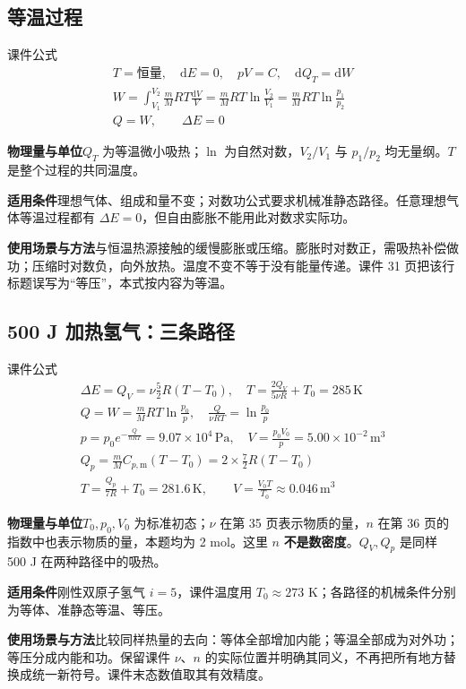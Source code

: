 \documentclass[UTF8,fontset=none,zihao=-4,a4paper]{ctexart}
\newcommand{\unit}[1]{\,\mathrm{#1}}
\newcommand{\explain}[3]{\par\noindent\textbf{物理量与单位}\quad #1\par
\noindent\textbf{适用条件}\quad #2\par
\noindent\textbf{使用场景与方法}\quad #3\par}
\begin{document}
\par\noindent\begin{minipage}{\linewidth}
\subsection{等温过程}
\begin{infobox}[breakable=false]{课件公式}
\begin{gather*}T=\text{恒量},\quad\mathrm dE=0,\quad pV=C,\quad\mathrm dQ_T=\mathrm dW\\W=\int_{V_1}^{V_2}\frac mM RT\frac{\mathrm dV}V=\frac mM RT\ln\frac{V_2}{V_1}=\frac mM RT\ln\frac{p_1}{p_2}\\Q=W,\qquad\Delta E=0\end{gather*}
\end{infobox}
\end{minipage}\par
\explain{$Q_T$ 为等温微小吸热；$\ln$ 为自然对数，$V_2/V_1$ 与 $p_1/p_2$ 均无量纲。$T$ 是整个过程的共同温度。}{理想气体、组成和量不变；对数功公式要求机械准静态路径。任意理想气体等温过程都有 $\Delta E=0$，但自由膨胀不能用此对数求实际功。}{与恒温热源接触的缓慢膨胀或压缩。膨胀时对数正，需吸热补偿做功；压缩时对数负，向外放热。温度不变不等于没有能量传递。课件 31 页把该行标题误写为“等压”，本式按内容为等温。}


\par\noindent\begin{minipage}{\linewidth}
\subsection{500 J 加热氢气：三条路径}
\begin{infobox}[breakable=false]{课件公式}
\begin{gather*}\Delta E=Q_V=\nu\frac52R(T-T_0),\quad T=\frac{2Q_V}{5\nu R}+T_0=285\unit K\\Q=W=\frac mM RT\ln\frac{p_0}p,\quad\frac Q{\nu RT}=\ln\frac{p_0}p\\p=p_0e^{-\frac Q{nRT}}=9.07\times10^4\unit{Pa},\quad V=\frac{p_0V_0}p=5.00\times10^{-2}\unit{m^3}\\Q_p=\frac mM C_{p,\mathrm m}(T-T_0)=2\times\frac72R(T-T_0)\\T=\frac{Q_p}{7R}+T_0=281.6\unit K,\qquad V=\frac{V_0T}{T_0}\approx0.046\unit{m^3}\end{gather*}
\end{infobox}
\end{minipage}\par
\explain{$T_0,p_0,V_0$ 为标准初态；$\nu$ 在第 35 页表示物质的量，$n$ 在第 36 页的指数中也表示物质的量，本题均为 2 mol。这里 $n$ \textbf{不是数密度}。$Q_V,Q_p$ 是同样 500 J 在两种路径中的吸热。}{刚性双原子氢气 $i=5$，课件温度用 $T_0\approx273$ K；各路径的机械条件分别为等体、准静态等温、等压。}{比较同样热量的去向：等体全部增加内能；等温全部成为对外功；等压分成内能和功。保留课件 $\nu$、$n$ 的实际位置并明确其同义，不再把所有地方替换成统一新符号。课件末态数值取其有效精度。}
\end{document}
